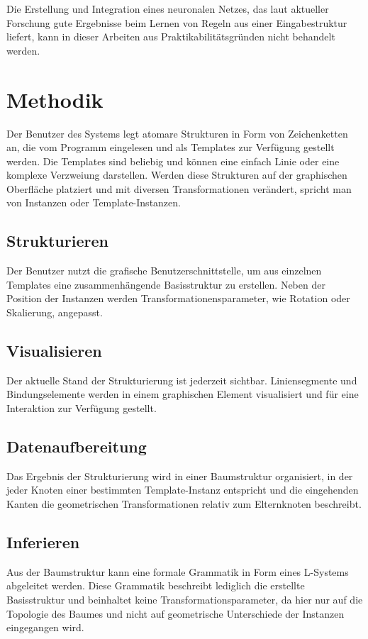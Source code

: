 Die Erstellung und Integration eines neuronalen Netzes, das laut aktueller Forschung gute Ergebnisse beim Lernen von
Regeln aus einer Eingabestruktur liefert, kann in dieser Arbeiten aus Praktikabilitätsgründen nicht behandelt werden.

\section{Methodik}
Der Benutzer des Systems legt atomare Strukturen in Form von Zeichenketten an, die vom Programm eingelesen und
als Templates zur Verfügung gestellt werden.
Die Templates sind beliebig und können eine einfach Linie oder eine komplexe Verzweiung darstellen.
Werden diese Strukturen auf der graphischen Oberfläche platziert und mit diversen Transformationen verändert, spricht man
von Instanzen oder Template-Instanzen.

\subsection*{Strukturieren}
Der Benutzer nutzt die grafische Benutzerschnittstelle, um aus einzelnen Templates eine zusammenhängende Basisstruktur zu
erstellen.
Neben der Position der Instanzen werden Transformationensparameter, wie Rotation oder Skalierung, angepasst.

\subsection*{Visualisieren}
Der aktuelle Stand der Strukturierung ist jederzeit sichtbar.
Liniensegmente und Bindungselemente werden in einem graphischen Element visualisiert und für eine Interaktion zur Verfügung
gestellt.

\subsection*{Datenaufbereitung}
Das Ergebnis der Strukturierung wird in einer Baumstruktur
organisiert, in der jeder Knoten einer bestimmten Template-Instanz entspricht und die eingehenden Kanten die
geometrischen Transformationen relativ zum Elternknoten beschreibt.

\subsection*{Inferieren}
Aus der Baumstruktur kann eine formale Grammatik in Form eines L-Systems abgeleitet werden.
Diese Grammatik beschreibt lediglich die erstellte Basisstruktur und beinhaltet keine Transformationsparameter, da hier
nur auf die Topologie des Baumes und nicht auf geometrische Unterschiede der Instanzen eingegangen wird.

